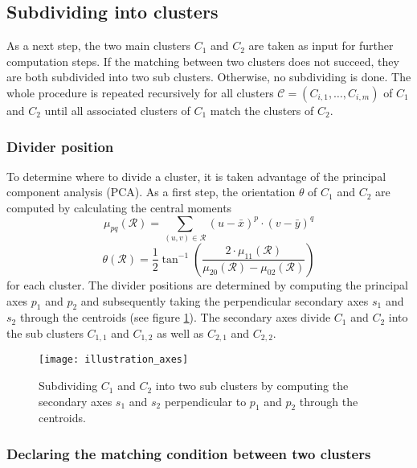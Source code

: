 \subsection{Subdividing into clusters}
\label{Subdividing}

As a next step, the two main clusters $C_1$ and $C_2$ are taken as input for further computation steps. If the matching between two clusters does not succeed, they are both subdivided into two sub clusters. Otherwise, no subdividing is done. The whole procedure is repeated recursively for all clusters $\mathcal{C} = (C_{i,1}, \ldots, C_{i,m})$ of $C_1$ and $C_2$ until all associated clusters of $C_1$ match the clusters of $C_2$.  

\subsubsection{Divider position}

To determine where to divide a cluster, it is taken advantage of the principal component analysis (PCA). As a first step, the orientation $\theta$ of $C_1$ and $C_2$ are computed by calculating the central moments
\begin{equation}
	\mu_{pq}(\mathcal{R}) = \sum_{(u,v)\in\mathcal{R}} (u - \bar{x})^p \cdot (v - \bar{y})^q
\end{equation}
\begin{equation}
	\theta(\mathcal{R}) = \frac{1}{2} \tan^{-1} \left(\frac{2\cdot \mu_{11}(\mathcal{R})}{\mu_{20}(\mathcal{R}) - \mu_{02}(\mathcal{R})}\right)
\end{equation}
for each cluster.	
The divider positions are determined by computing the principal axes $p_{1}$ and $p_{2}$ and subsequently taking the perpendicular secondary axes $s_{1}$ and $s_{2}$ through the centroids (see figure \ref{fig:dc_axes_2p}). The secondary axes divide $C_1$ and $C_2$ into the sub clusters $C_{1,1}$ and $C_{1,2}$ as well as $C_{2,1}$ and $C_{2,2}$.

\begin{figure}
	\centering
	\texttt{[image: illustration\_axes]}
	\caption{Subdividing $C_1$ and $C_2$ into two sub clusters by computing the secondary axes $s_1$ and $s_2$ perpendicular to $p_1$ and $p_2$ through the centroids.}
	\label{fig:dc_axes_2p}
\end{figure}

\subsubsection{Declaring the matching condition between two clusters}

